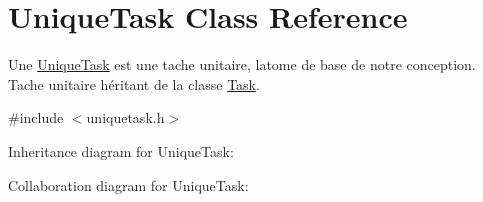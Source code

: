 \hypertarget{class_unique_task}{}\section{Unique\+Task Class Reference}
\label{class_unique_task}


Une \hyperlink{class_unique_task}{Unique\+Task} est une tache unitaire, l\textquotesingle{}atome de base de notre conception. Tache unitaire héritant de la classe \hyperlink{class_task}{Task}.  




{\ttfamily \#include $<$uniquetask.\+h$>$}



Inheritance diagram for Unique\+Task\+:


Collaboration diagram for Unique\+Task\+:
